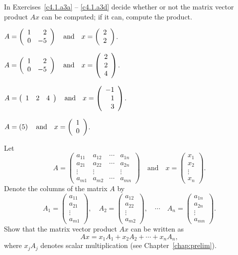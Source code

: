 \noindent In Exercises~\ref{c4.1.a3a} -- \ref{c4.1.a3d} decide whether or
not the matrix vector product $Ax$ can be computed; if it can, compute the
product.
\begin{exercise} \label{c4.1.a3a}
$A=\left(\begin{array}{rr} 1 & 2\\ 0 &-5\end{array}\right) \quad\mbox{and}\quad x = \left(\begin{array}{r} 2 \\ 2\end{array}\right)$.
\end{exercise}
\begin{exercise} \label{c4.1.a3b}
$A=\left(\begin{array}{rr} 1 & 2\\ 0 &-5\end{array}\right) \quad\mbox{and}\quad
x = \left(\begin{array}{r} 2\\ 2 \\4\end{array}\right)$.
\end{exercise}
\begin{exercise} \label{c4.1.a3c}
$A=\left(\begin{array}{rrr} 1 & 2 & 4 \end{array}\right) \quad\mbox{and}\quad
x = \left(\begin{array}{r} -1\\ 1 \\3\end{array}\right)$.
\end{exercise}
\begin{exercise} \label{c4.1.a3d}
$A=\left(5\right) \quad\mbox{and}\quad x = \left(\begin{array}{r} 1 \\ 0\end{array}\right)$.
\end{exercise}

\begin{exercise} \label{c4.1.b3}
Let
\[
A=\left(
\begin{array}{rrrr}
 a_{11} & a_{12} & \cdots & a_{1n} \\
 a_{21} & a_{22} & \cdots & a_{2n}  \\
 \vdots & \vdots &        & \vdots  \\
 a_{m1} & a_{m2} & \cdots & a_{mn}
\end{array}
\right)\quad\mbox{and}\quad
x =
\left( \begin{array}{r} x_1\\ x_2\\ \vdots\\ x_n\end{array}\right).
\]
Denote the columns of the matrix $A$ by
\[
A_1 =
\left(\begin{array}{c} a_{11}\\ a_{21}\\ \vdots\\
a_{m1}\end{array}\right),\quad
A_2 =
\left(\begin{array}{c} a_{12}\\ a_{22}\\ \vdots\\
a_{m2}\end{array}\right),\quad
\cdots\quad
A_n =
\left(\begin{array}{c} a_{1n}\\ a_{2n}\\ \vdots\\ a_{mn}\end{array}\right).
\]
Show that the matrix vector product $Ax$ can be written as
\[
Ax = x_1 A_1 + x_2 A_2 + \cdots + x_n A_n,
\]
where $x_j A_j$ denotes scalar multiplication (see Chapter~\ref{chap:prelim}).
\end{exercise}


